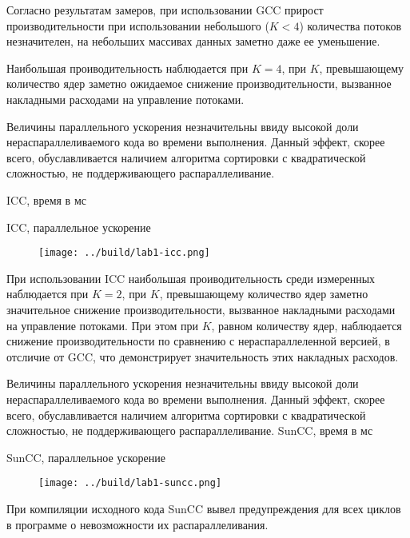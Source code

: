 \documentclass[14pt, a4paper, oneside, final]{extarticle}
\begin{document}
Согласно результатам замеров, при использовании GCC прирост производительности при использовании небольшого ($K < 4$) количества потоков незначителен, на небольших массивах данных заметно даже ее уменьшение.

Наибольшая проиводительность наблюдается при $K=4$, при $K$, превышающему количество ядер заметно ожидаемое снижение производительности, вызванное накладными расходами на управление потоками.

Величины параллельного ускорения незначительны ввиду высокой доли нераспараллеливаемого кода во времени выполнения. Данный эффект, скорее всего, обуславливается наличием алгоритма сортировки с квадратической сложностью, не поддерживающего распараллеливание.


\clearpage
ICC, время в мс


ICC, параллельное ускорение



\begin{figure}[ht!]

\texttt{[image: ../build/lab1-icc.png]}
\end{figure}
При использовании ICC наибольшая проиводительность среди измеренных наблюдается при $K=2$, при $K$, превышающему количество ядер заметно значительное снижение производительности, вызванное накладными расходами на управление потоками. При этом при $K$, равном количеству ядер, наблюдается снижение производительности по сравнению с нераспараллеленной версией, в отсличие от GCC, что демонстрирует значительность этих накладных расходов.

Величины параллельного ускорения незначительны ввиду высокой доли нераспараллеливаемого кода во времени выполнения. Данный эффект, скорее всего, обуславливается наличием алгоритма сортировки с квадратической сложностью, не поддерживающего распараллеливание.
\clearpage
SunCC, время в мс


SunCC, параллельное ускорение


\begin{figure}[ht!]

\texttt{[image: ../build/lab1-suncc.png]}
\end{figure}

При компиляции исходного кода SunCC вывел предупреждения для всех циклов в программе о невозможности их распараллеливания.
\end{document}
